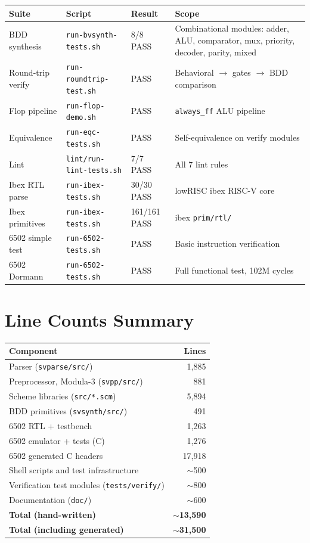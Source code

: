 \documentclass[11pt]{article}
\begin{document}
\begin{longtable}{@{}lllp{6cm}@{}}
\toprule
Suite & Script & Result & Scope \\
\midrule
BDD synthesis & \texttt{run-bvsynth-tests.sh} & 8/8 \textcolor{pass}{PASS} &
  Combinational modules: adder, ALU, comparator, mux, priority, decoder, parity, mixed \\
Round-trip verify & \texttt{run-roundtrip-test.sh} & \textcolor{pass}{PASS} &
  Behavioral $\to$ gates $\to$ BDD comparison \\
Flop pipeline & \texttt{run-flop-demo.sh} & \textcolor{pass}{PASS} &
  \texttt{always\_ff} ALU pipeline \\
Equivalence & \texttt{run-eqc-tests.sh} & \textcolor{pass}{PASS} &
  Self-equivalence on verify modules \\
Lint & \texttt{lint/run-lint-tests.sh} & 7/7 \textcolor{pass}{PASS} &
  All 7 lint rules \\
Ibex RTL parse & \texttt{run-ibex-tests.sh} & 30/30 \textcolor{pass}{PASS} &
  lowRISC ibex RISC-V core \\
Ibex primitives & \texttt{run-ibex-tests.sh} & 161/161 \textcolor{pass}{PASS} &
  ibex \texttt{prim/rtl/} \\
6502 simple test & \texttt{run-6502-tests.sh} & \textcolor{pass}{PASS} &
  Basic instruction verification \\
6502 Dormann & \texttt{run-6502-tests.sh} & \textcolor{pass}{PASS} &
  Full functional test, 102M cycles \\
\bottomrule
\end{longtable}

\section{Line Counts Summary}

\begin{tabular}{@{}lr@{}}
\toprule
Component & Lines \\
\midrule
Parser (\texttt{svparse/src/}) & 1,885 \\
Preprocessor, Modula-3 (\texttt{svpp/src/}) & 881 \\
Scheme libraries (\texttt{src/*.scm}) & 5,894 \\
BDD primitives (\texttt{svsynth/src/}) & 491 \\
6502 RTL + testbench & 1,263 \\
6502 emulator + tests (C) & 1,276 \\
6502 generated C headers & 17,918 \\
Shell scripts and test infrastructure & $\sim$500 \\
Verification test modules (\texttt{tests/verify/}) & $\sim$800 \\
Documentation (\texttt{doc/}) & $\sim$600 \\
\midrule
\textbf{Total (hand-written)} & $\sim$\textbf{13,590} \\
\textbf{Total (including generated)} & $\sim$\textbf{31,500} \\
\bottomrule
\end{tabular}
\end{document}
